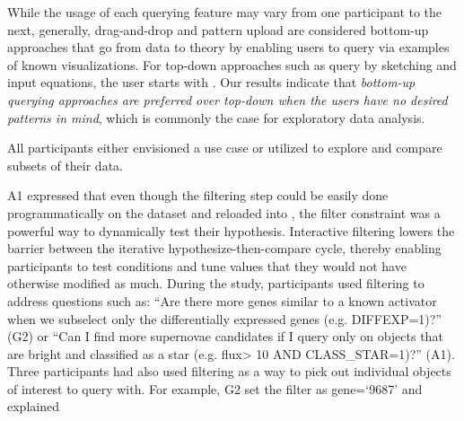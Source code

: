 \par While the usage of each querying feature may vary from one participant to the next, generally,  drag-and-drop and pattern upload are considered bottom-up approaches that go from data to theory by enabling users to query via examples of known visualizations. For top-down approaches such as query by sketching and input equations, the user starts with . Our results indicate that \emph{bottom-up querying approaches are preferred over top-down when the users have no desired patterns in mind}, which is commonly the case for exploratory data analysis.
\par All participants either envisioned a use case or utilized  to explore and compare subsets of their data.
\par A1 expressed that even though the filtering step could be easily done programmatically on the dataset and reloaded into \zv, the filter constraint was a powerful way to dynamically test their hypothesis. Interactive filtering lowers the barrier between the iterative hypothesize-then-compare cycle, thereby enabling participants to test conditions and tune values that they would not have otherwise modified as much.
During the study, participants used filtering to address questions such as: ``Are there more genes similar to a known activator when we subselect only the differentially expressed genes (e.g. DIFFEXP=1)?'' (G2) or ``Can I find more supernovae candidates if I query only on objects that are bright and classified as a star (e.g. flux\textgreater
10 AND CLASS\_STAR=1)?'' (A1). Three participants had also used filtering as a way to pick out individual objects of interest to query with. For example, G2 set the filter as gene=`9687' and explained 

